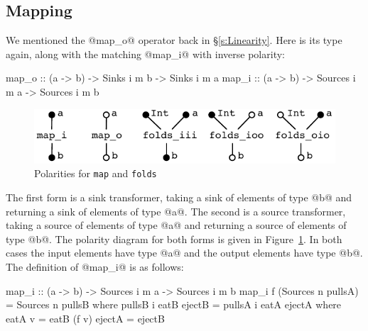\subsection{Mapping}
\label{s:Mapping}
We mentioned the @map_o@ operator back in \S\ref{s:Linearity}. Here is its type again, along with the matching @map_i@ with inverse polarity:

\begin{code}
map_o :: (a -> b) -> Sinks   i m b -> Sinks   i m a
map_i :: (a -> b) -> Sources i m a -> Sources i m b
\end{code}

\begin{figure}
\begin{center}
\includegraphics[scale=0.8]{figures/maps.pdf}
\end{center}
\vspace{-0.5em}
\caption{Polarities for \texttt{map} and \texttt{folds}}
\label{f:Map}
\end{figure}

The first form is a sink transformer, taking a sink of elements of type @b@ and returning a sink of elements of type @a@. The second is a source transformer, taking a source of elements of type @a@ and returning a source of elements of type @b@. The polarity diagram for both forms is given in Figure~\ref{f:Map}. In both cases the input elements have type @a@ and the output elements have type @b@. The definition of @map_i@ is as follows:
\begin{code}
map_i :: (a -> b) -> Sources i m a -> Sources i m b
map_i f (Sources n pullsA)
 = Sources n pullsB
 where  pullsB i eatB ejectB
         = pullsA i eatA ejectA
         where  eatA v = eatB (f v)
                ejectA = ejectB
\end{code}


